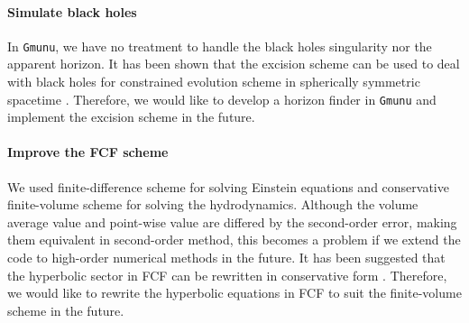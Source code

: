 \paragraph{Simulate black holes}
In \texttt{Gmunu}, we have no treatment to handle the black holes singularity nor the apparent horizon.
It has been shown that the excision scheme can be used to deal with black holes for constrained evolution scheme in spherically symmetric spacetime \cite{cordero2014excision}.
Therefore, we would like to develop a horizon finder in \texttt{Gmunu} and implement the excision scheme in the future.

\paragraph{Improve the FCF scheme}
We used finite-difference scheme for solving Einstein equations and conservative finite-volume scheme for solving the hydrodynamics.
Although the volume average value and point-wise value are differed by the second-order error,
making them equivalent in second-order method,
this becomes a problem if we extend the code to high-order numerical methods in the future.
It has been suggested that the hyperbolic sector in FCF can be rewritten in conservative form \cite{cordero2008mathematical}.
Therefore, we would like to rewrite the hyperbolic equations in FCF to suit the finite-volume scheme in the future.

